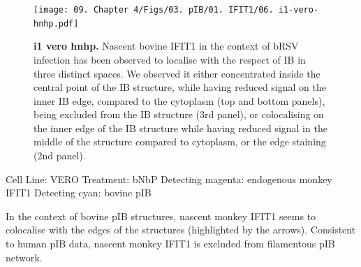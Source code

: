 \begin{figure}
    \centering
    \texttt{[image: 09. Chapter 4/Figs/03. pIB/01. IFIT1/06. i1-vero-hnhp.pdf]}
    \caption[i1 vero hnhp]{\textbf{i1 vero hnhp.} Nascent bovine IFIT1 in the context of bRSV infection has been observed to localise with the respect of IB in three distinct spaces. We observed it either concentrated inside the central point of the IB structure, while having reduced signal on the inner IB edge, compared to the cytoplasm (top and bottom panels), being excluded from the IB structure (3rd panel), or colocalising on the inner edge of the IB structure while having reduced signal in the middle of the structure compared to cytoplasm, or the edge staining (2nd panel).}
    \label{fig:i1 vero hnhp}
\end{figure}

Cell Line: VERO \newline
Treatment: bNbP \newline
Detecting magenta: endogenous monkey IFIT1 \newline
Detecting cyan: bovine pIB \newline

In the context of bovine pIB structures, nascent monkey IFIT1 seems to colocalise with the edges of the structures (highlighted by the arrows). Consistent to human pIB data, nascent monkey IFIT1 is excluded from filamentous pIB network.

